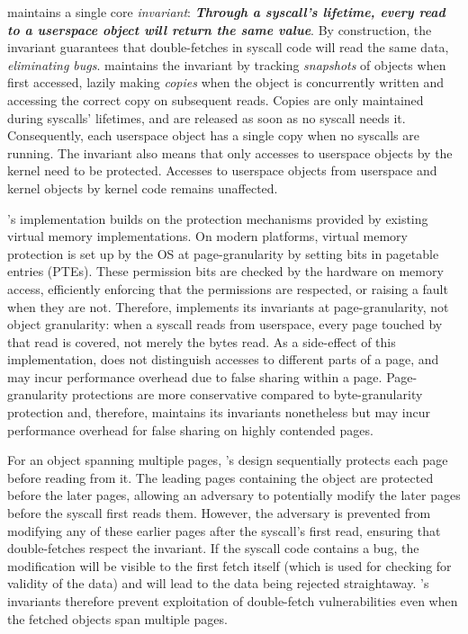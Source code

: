 \documentclass[letterpaper,twocolumn,10pt, anonymous]{article}
\begin{document}
\tiktok maintains a single core \emph{invariant}:
\textbf{\emph{Through a syscall's lifetime, every read to a userspace object 
will return the same value}}.
By construction, the invariant guarantees that double-fetches in syscall
code will read the same data, \emph{eliminating \tocttou bugs}.
\tiktok maintains the invariant by tracking \emph{snapshots} of objects
when first accessed, lazily making \emph{copies} when the object is concurrently 
written and accessing the correct copy on subsequent reads.
Copies are only maintained during syscalls' lifetimes, and are released as 
soon as no syscall needs it.
Consequently, each userspace object has a single copy when no syscalls are
running.
The invariant also means that only accesses to userspace objects by the kernel
need to be protected. 
Accesses to userspace objects from userspace and kernel objects by kernel 
code remains unaffected.

\tiktok's implementation builds on the protection mechanisms provided by 
existing virtual memory implementations.
On modern platforms, virtual memory protection is set up by the OS at
page-granularity by setting bits in pagetable entries (PTEs).
These permission bits are checked by the hardware on memory access, 
efficiently enforcing that the permissions are respected, or raising 
a fault when they are not.
Therefore, \tiktok implements its invariants at page-granularity, not object 
granularity: when a syscall reads from userspace, every page touched by that 
read is covered, not merely the bytes read.
As a side-effect of this implementation, \tiktok does not distinguish
accesses to different parts of a page, and may incur performance overhead due
to false sharing within a page. 
Page-granularity protections are more conservative compared to byte-granularity
protection and, therefore, \tiktok maintains its invariants nonetheless but may
incur performance overhead for false sharing on highly contended pages.

For an object spanning multiple pages, \tiktok's design sequentially 
protects each page before reading from it.
The leading pages containing the object are protected before the
later pages, allowing an adversary to potentially modify the later 
pages before the syscall first reads them.
However, the adversary is prevented from modifying any of these earlier pages
after the syscall's first read, ensuring that double-fetches respect
the invariant.
If the syscall code contains a \tocttou bug, the modification will
be visible to the first fetch itself (which is used for checking for 
validity of the data) and will lead to the data being rejected 
straightaway.
\tiktok's invariants therefore prevent exploitation of double-fetch
vulnerabilities even when the fetched objects span multiple pages.
\end{document}
